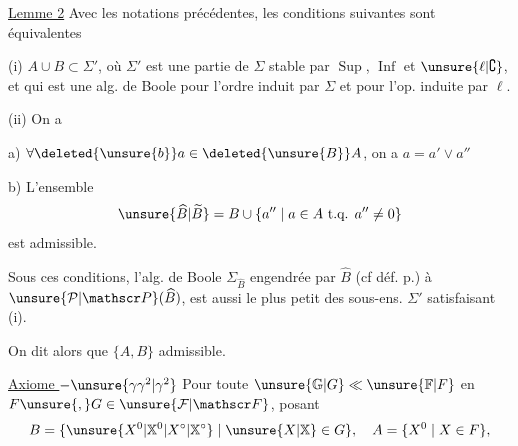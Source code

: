 
\uline{Lemme 2} Avec les notations précédentes, les conditions suivantes sont équivalentes

(i) $A\cup B\subset\Sigma'$, où $\Sigma'$ est une partie de $\Sigma$ stable par $\operatorname{Sup}$, $\operatorname{Inf}$ et $\unsure{\ell|\complement}$, et qui est une alg. de Boole pour l'ordre induit par $\Sigma$ et pour l'op. induite par $\ell$.

(ii) On a

 a) $\forall\deleted{\unsure{b}}a\in\deleted{\unsure{B}}A$, on a $a=a'\vee a''$

 b)  L'ensemble 
\[
\unsure{\widehat B|\widetilde B}=B\cup\{a''\mid a\in A\text{ t.q. }a''\ne0\}
\]
est admissible.

Sous ces conditions, l'alg. de Boole $\Sigma_{\widehat B}$ engendrée par $\widehat B$ (cf déf. p.)   à $\unsure{\mathcal P|\mathscr P}(\widehat B)$, est aussi le plus petit des sous-ens. $\Sigma'$ satisfaisant (i).

On dit alors que $\{A,B\}$  admissible.

\uline{Axiome  $-\unsure{\gamma\gamma^2|\gamma^2}$} Pour toute  $\unsure{\mathbb G|G}\ll\unsure{\mathbb F|F}$ en $F\unsure{,}G\in\unsure{\mathcal F|\mathscr F}$, posant
\[
B=\{\unsure{X^0|\mathbb X^0|X^\circ|\mathbb X^\circ}\mid\unsure{X|\mathbb X}\in G\},\quad A=\{X^0\mid X\in F\},
\]
